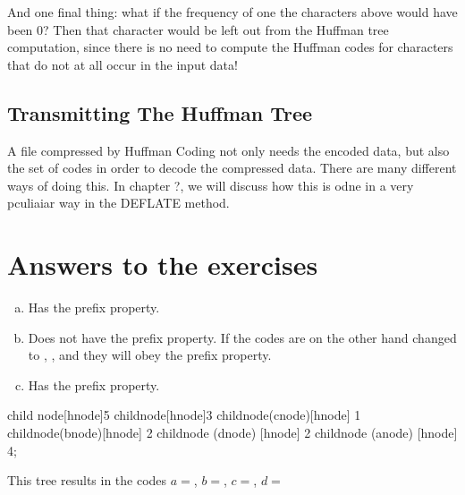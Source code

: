 And one final thing: what if the frequency of one the characters above
would have been 0? Then that character would be left out from the
Huffman tree computation, since there is no need to compute the
Huffman codes for characters that do not at all occur in the input
data!

\subsection{Transmitting The Huffman Tree}

A file compressed by Huffman Coding not only needs the encoded data,
but also the set of codes in order to decode the compressed
data. There are many different ways of doing this. In chapter ?, we
will discuss how this is odne in a very pculiaiar way in the DEFLATE method.

\section{Answers to the exercises}

\begin{Answer}[ref={prefix-prop}]

  \begin{enumerate}[(a)]
  \item Has the prefix property.
  \item Does not have the prefix property. If the codes are on the
    other hand changed to , ,  and 
    they will obey the prefix property.
  \item Has the prefix property.

  \end{enumerate}

\end{Answer}

\begin{Answer}[ref={nuther}]
  \begin{huffmanc}

    child {node[hnode]{5}
      child{node[hnode]{3}
        child{node(cnode)[hnode] {1}}
        child{node(bnode)[hnode] {2}}}
      child{node (dnode) [hnode] {2}}}
    child{node (anode) [hnode] {4}};


  \end{huffmanc}

  This tree results in the codes $a=$, $b=$,
  $c=$, $d=$

\end{Answer}